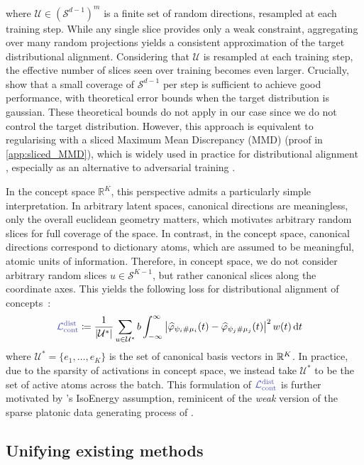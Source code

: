 \documentclass{article}
\begin{document}
%
where $\mathcal{U} \in (\mathcal{S}^{d-1})^m$ is a finite set of random directions, resampled at each training step. While any single slice provides only a weak constraint, aggregating over many random projections yields a consistent approximation of the target distributional alignment. Considering that $\mathcal{U}$ is resampled at each training step, the effective number of slices seen over training becomes even larger. Crucially, \citet{TODO:LeJEPA} show that a small coverage of $\mathcal{S}^{d-1}$ per step is sufficient to achieve good performance, with theoretical error bounds when the target distribution is gaussian. These theoretical bounds do not apply in our case since we do not control the target distribution. However, this approach is equivalent to regularising with a sliced Maximum Mean Discrepancy (MMD) (proof in \cref{app:sliced_MMD}), which is widely used in practice for distributional alignment \citep{TODO}, especially as an alternative to adversarial training \citep{TODO}.

In the concept space $\mathbb{R}^K$, this perspective admits a particularly simple interpretation. In arbitrary latent spaces, canonical directions are meaningless, only the overall euclidean geometry matters, which motivates arbitrary random slices for full coverage of the space. In contrast, in the concept space, canonical directions correspond to dictionary atoms, which are assumed to be meaningful, atomic units of information. Therefore, in concept space, we do not consider arbitrary random slices $u \in \mathcal{S}^{K-1}$, but rather canonical slices along the coordinate axes. This yields the following loss for distributional alignment of concepts~:
%
\begin{align}
\label{eq:sliced_contrastive_loss}
\Lcontdist
&\coloneqq \frac{1}{|\mathcal{U}^*|} \sum_{u \in \mathcal{U}^*} b \int_{-\infty}^{\infty} \left|\widehat{\varphi}_{\psi_i \# \mu_i}(t) - \widehat{\varphi}_{\psi_j \# \mu_j}(t)\right|^2 w(t)\,\mathrm{d}t
\end{align}
%
where $\mathcal{U}^* = \{e_1, \dots, e_K\}$ is the set of canonical basis vectors in $\mathbb{R}^K$. In practice, due to the sparsity of activations in concept space, we instead take $\mathcal{U}^*$ to be the set of active atoms across the batch. This formulation of $\Lcontdist$ is further motivated by \citet{TODO:dhimoila}'s IsoEnergy assumption, reminicent of the \emph{weak} version of the sparse platonic data generating process of .

\subsection{Unifying existing methods}
\end{document}
